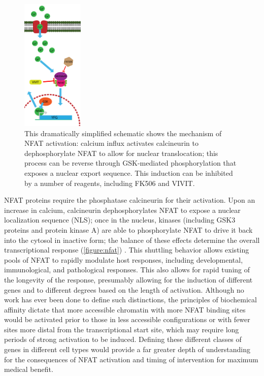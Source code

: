 \begin{figure}
\centering
\includegraphics[height=2.5in]{images/nfatact.pdf}
\caption{This dramatically simplified schematic shows the mechanism of NFAT activation: calcium influx activates calcineurin to dephosphorylate NFAT to allow for nuclear translocation; this process can be reverse through GSK-mediated phosphorylation that exposes a nuclear export sequence. This induction can be inhibited by a number of reagents, including FK506 and VIVIT.}
\label{figure:nfat}
\end{figure}

NFAT proteins require the phosphatase calcineurin for their activation. Upon an increase in calcium, calcineurin dephosphorylates NFAT to expose a nuclear localization sequence (NLS); once in the nucleus, kinases (including GSK3 proteins and protein kinase A) are able to phosphorylate NFAT to drive it back into the cytosol in inactive form; the balance of these effects determine the overall transcriptional response (\autoref{figure:nfat}) \citep{Crabtree2002}. This shuttling behavior allows existing pools of NFAT to rapidly modulate host responses, including developmental, immunological, and pathological responses. This also allows for rapid tuning of the longevity of the response, presumably allowing for the induction of different genes and to different degrees based on the length of activation. Although no work has ever been done to define such distinctions, the principles of biochemical affinity dictate that more accessible chromatin with more NFAT binding sites would be activated prior to those in less accessible configurations or with fewer sites more distal from the transcriptional start site, which may require long periods of strong activation to be induced. Defining these different classes of genes in different cell types would provide a far greater depth of understanding for the consequences of NFAT activation and timing of intervention for maximum medical benefit.

